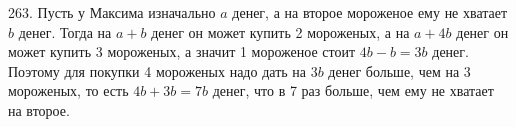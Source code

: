 263. Пусть у Максима изначально $a$ денег, а на второе мороженое ему не хватает $b$ денег. Тогда на $a+b$ денег он может купить 2 мороженых, а на $a+4b$ денег он может купить 3 мороженых, а значит 1 мороженое стоит $4b-b=3b$ денег. Поэтому для покупки 4 мороженых надо дать на $3b$ денег больше, чем на 3 мороженых, то есть $4b+3b=7b$ денег, что в 7 раз больше, чем ему не хватает на второе.\\
